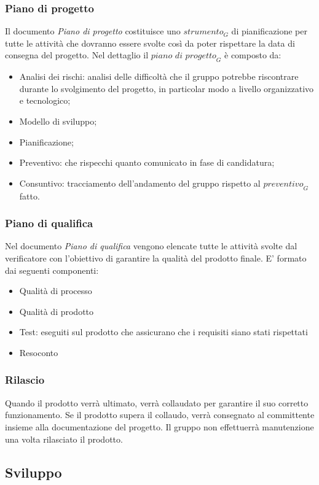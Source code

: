 \subsubsection{Piano di progetto}
Il documento \textit{Piano di progetto} costituisce uno $\textit{strumento}_G$ di pianificazione per tutte le attività che dovranno essere svolte così da poter rispettare la data di consegna del progetto.
Nel dettaglio il $\textit{piano di progetto}_G$ è composto da:
\begin{itemize}
    \item Analisi dei rischi: analisi delle difficoltà che il gruppo potrebbe riscontrare durante lo svolgimento del progetto, in particolar modo a livello organizzativo e tecnologico;
    \item Modello di sviluppo;
    \item Pianificazione;
    \item Preventivo: che rispecchi quanto comunicato in fase di candidatura;
    \item Consuntivo: tracciamento dell'andamento del gruppo rispetto al $\textit{preventivo}_G$ fatto.
\end{itemize}
\subsubsection{Piano di qualifica}
Nel documento \textit{Piano di qualifica} vengono elencate tutte le attività svolte dal verificatore con l'obiettivo di garantire la qualità del prodotto finale.
E' formato dai seguenti componenti:
\begin{itemize}
    \item Qualità di processo
    \item Qualità di prodotto
    \item Test: eseguiti sul prodotto che assicurano che i requisiti siano stati rispettati
    \item Resoconto
\end{itemize}
\subsubsection{Rilascio}
Quando il prodotto verrà ultimato, verrà collaudato per garantire il suo corretto funzionamento. Se il prodotto supera il collaudo, verrà consegnato al committente insieme alla documentazione del progetto. 
Il gruppo non effettuerrà manutenzione una volta rilasciato il prodotto.

\subsection{Sviluppo}

